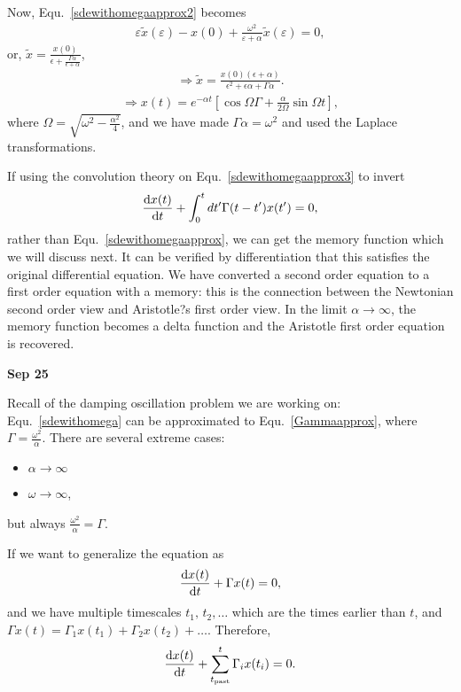 Now, Equ.~\eqref{sdewithomegaapprox2} becomes
\begin{align}
\varepsilon \tilde{x}(\varepsilon)- x(0) + \frac{\omega^2}{\varepsilon + \alpha}\tilde{x}(\varepsilon)=0, \label {sdewithomegaapprox3} 
\end{align}
or, $ \tilde{x}= \frac{x(0)}{\epsilon + \frac{\Gamma \alpha}{\epsilon + \alpha}} $,
\begin{align}
\Rightarrow \tilde{x}= \frac{x(0)(\epsilon+ \alpha)}{\epsilon^2 + \epsilon \alpha +\Gamma \alpha}.
\end{align}
\begin{align}
\Rightarrow x(t)= e^{-\alpha t}[\cos \Omega \Gamma + \frac{\alpha}{2\Omega}\sin \Omega t], \label{sdewithomegaapprox4}
\end{align}
where $ \Omega= \sqrt{\omega^2 - \frac{\alpha^2}{4}} $, and we have made $ \Gamma \alpha= \omega^2 $ and used the Laplace transformations. 

If using the convolution theory on Equ.~\eqref{sdewithomegaapprox3} to invert
\begin{align}
\frac{{\mathrm d} {x(t)}}{{\mathrm d}t}+ \int_0^t dt' \Gamma(t-t')x(t')=0, 
\end{align}
rather than Equ.~\eqref{sdewithomegaapprox}, we can get the memory function which we will discuss next. It can be verified by differentiation that this satisfies the
original differential equation. We have converted a second order equation to a first order
equation with a memory: this is the connection between the Newtonian second order view
and Aristotle?s first order view. In the limit $ \alpha\rightarrow \infty $, the memory function becomes a delta
function and the Aristotle first order equation is recovered.

\textbf{Sep 25}

Recall of the damping oscillation problem we are working on: Equ.~\eqref{sdewithomega} can be approximated to Equ.~\eqref{Gammaapprox}, where $ \Gamma=\frac{\omega^2}{\alpha} $. There are several extreme cases: 
\begin{itemize}
\item $ \alpha \rightarrow \infty $
\item $ \omega \rightarrow \infty $,
\end{itemize}
but always $ \frac{\omega^2}{\alpha}=\Gamma $. 

If we want to generalize the equation as
\begin{align}
\frac{{\mathrm d} {x(t)}}{{\mathrm d}t}+ \Gamma x(t)=0,
\end{align}
and  we have multiple timescales $ t_1,\, t_2, \ldots $ which are the times earlier than $ t $, and $ \Gamma x(t)= \Gamma_1 x(t_1)+ \Gamma_2 x(t_2)+\ldots $.
Therefore, 
\begin{align}
\frac{{\mathrm d} {x(t)}}{{\mathrm d}t}+ \sum_{t_{\text{past}}}^t \Gamma_i x(t_i)=0.
\end{align}

